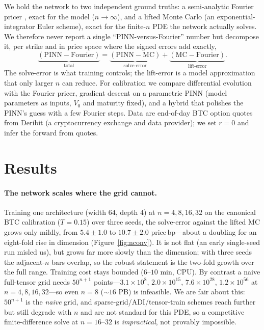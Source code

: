 \documentclass[11pt]{article}
\newcommand{\bp}{\ensuremath{\,\mathrm{bp}}}
\begin{document}
We hold the network to two independent ground truths: a semi-analytic Fourier
pricer \citep{eleuch2019characteristic,carr1999option}, exact for the model
($n\to\infty$), and a lifted Monte Carlo (an exponential-integrator Euler scheme),
exact for the finite-$n$ PDE the network actually solves. We therefore never
report a single ``PINN-versus-Fourier'' number but decompose it, per strike and in
price space where the signed errors add exactly,
\begin{equation}
\underbrace{(\mathrm{PINN}{-}\mathrm{Fourier})}_{\text{total}}
=\underbrace{(\mathrm{PINN}{-}\mathrm{MC})}_{\text{solve-error}}
+\underbrace{(\mathrm{MC}{-}\mathrm{Fourier})}_{\text{lift-error}} .
\label{eq:split}
\end{equation}
The solve-error is what training controls; the lift-error is a model approximation
that only larger $n$ can reduce. For calibration we compare differential evolution
with the Fourier pricer, gradient descent on a parametric PINN (model parameters as
inputs, $V_0$ and maturity fixed), and a hybrid that polishes the PINN's guess with
a few Fourier steps. Data are end-of-day BTC option quotes from Deribit (a
cryptocurrency exchange and data provider); we set $r=0$ and infer the forward from
quotes.

\section{Results}
\paragraph{The network scales where the grid cannot.}
Training one architecture (width $64$, depth $4$) at $n=4,8,16,32$ on the canonical
BTC calibration ($T=0.15$) over three seeds, the solve-error against the lifted MC
grows only mildly, from $5.4\pm1.0$ to $10.7\pm2.0$ price\bp{}---about a doubling
for an eight-fold rise in dimension (Figure~\ref{fig:nconv}). It is not flat (an
early single-seed run misled us), but grows far more slowly than the dimension;
with three seeds the adjacent-$n$ bars overlap, so the robust statement is the
two-fold growth over the full range. Training cost stays bounded ($6$--$10$ min,
CPU). By contrast a naive full-tensor grid needs $50^{n+1}$ points---$3.1\times
10^{8}$, $2.0\times10^{15}$, $7.6\times10^{28}$, $1.2\times10^{56}$ at
$n=4,8,16,32$---so even $n=8$ ($\sim\!16$ PB) is infeasible. We are fair about this:
$50^{n+1}$ is the \emph{naive} grid, and sparse-grid/ADI/tensor-train schemes reach
further but still degrade with $n$ and are not standard for this PDE, so a
competitive finite-difference solve at $n=16$--$32$ is \emph{impractical}, not
provably impossible.
\end{document}
